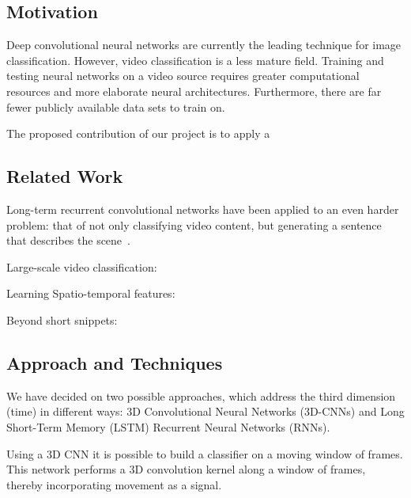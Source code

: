 \subsection*{Motivation}
Deep convolutional neural networks are currently the leading technique for image classification. However, video classification is a less mature field. Training and testing neural networks on a video source requires greater computational resources and more elaborate neural architectures. Furthermore, there are far fewer publicly available data sets to train on. 

The proposed contribution of our project is to apply a 
\subsection*{Related Work}

Long-term recurrent convolutional networks have been applied to an even harder problem: that of not only classifying video content, but generating a sentence that describes the scene~\cite{ltrcn}.

Large-scale video classification:~\cite{cnnvid}

Learning Spatio-temporal features:~\cite{stf}

Beyond short snippets:~\cite{snip}
\subsection*{Approach and Techniques}
We have decided on two possible approaches, which address the third dimension (time) in different ways: 3D Convolutional Neural Networks (3D-CNNs) and Long Short-Term Memory (LSTM) Recurrent Neural Networks (RNNs). 

Using a 3D CNN it is possible to build a classifier on a moving window of frames. This network performs a 3D convolution kernel along a window of frames, thereby incorporating movement as a signal.

